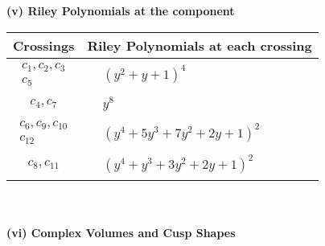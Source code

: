 \documentclass[1p]{elsarticle_modified}
\theoremstyle{definition}
\begin{document}
\newpage\renewcommand{\arraystretch}{1}
\flushleft \textbf{(v) Riley Polynomials at the component}\newline \\
\begin{tabular}{m{50pt}|m{274pt}}
Crossings & \hspace{64pt}Riley Polynomials at each crossing \\
\hline $$\begin{aligned}c_{1},c_{2},c_{3}\\c_{5}\end{aligned}$$&$\begin{aligned}
&(y^2+y+1)^4
\end{aligned}$\\
\hline $$\begin{aligned}c_{4},c_{7}\end{aligned}$$&$\begin{aligned}
&y^8
\end{aligned}$\\
\hline $$\begin{aligned}c_{6},c_{9},c_{10}\\c_{12}\end{aligned}$$&$\begin{aligned}
&(y^4+5 y^3+7 y^2+2 y+1)^2
\end{aligned}$\\
\hline $$\begin{aligned}c_{8},c_{11}\end{aligned}$$&$\begin{aligned}
&(y^4+y^3+3 y^2+2 y+1)^2
\end{aligned}$\\
\hline
\end{tabular}\\~\\
\newpage\flushleft \textbf{(vi) Complex Volumes and Cusp Shapes}
\end{document}
